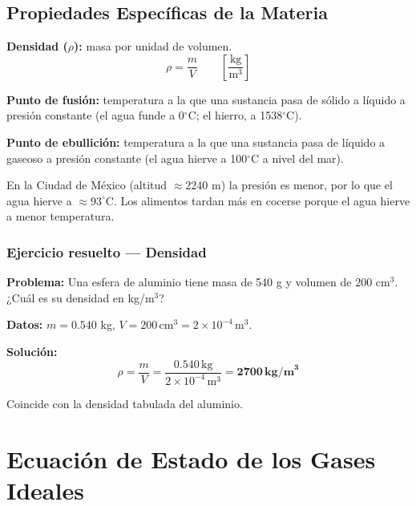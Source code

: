\subsection{Propiedades Específicas de la Materia}

\begin{seccion}
\begin{definicion}
\textbf{Densidad ($\rho$):} masa por unidad de volumen.
$$\rho = \frac{m}{V} \qquad \left[\frac{\text{kg}}{\text{m}^3}\right]$$
\end{definicion}

\begin{definicion}
\textbf{Punto de fusión:} temperatura a la que una sustancia pasa de sólido a líquido a presión constante (el agua funde a 0$^\circ$C; el hierro, a 1538$^\circ$C).
\end{definicion}

\begin{definicion}
\textbf{Punto de ebullición:} temperatura a la que una sustancia pasa de líquido a gaseoso a presión constante (el agua hierve a 100$^\circ$C a nivel del mar).
\end{definicion}

\begin{nota}
En la Ciudad de México (altitud $\approx 2240$ m) la presión es menor, por lo que el agua hierve a $\approx 93^\circ$C. Los alimentos tardan más en cocerse porque el agua hierve a menor temperatura.
\end{nota}
\end{seccion}

\subsubsection*{Ejercicio resuelto --- Densidad}

\begin{seccion}
\textbf{Problema:} Una esfera de aluminio tiene masa de 540 g y volumen de 200 cm$^3$. ¿Cuál es su densidad en kg/m$^3$?

\textbf{Datos:} $m = 0.540$ kg, $V = 200\,\text{cm}^3 = 2\times10^{-4}\,\text{m}^3$.

\textbf{Solución:}
$$\rho = \frac{m}{V} = \frac{0.540\,\text{kg}}{2\times10^{-4}\,\text{m}^3} = \mathbf{2700\,\text{kg/m}^3}$$

Coincide con la densidad tabulada del aluminio.
\end{seccion}

\section{Ecuación de Estado de los Gases Ideales}

